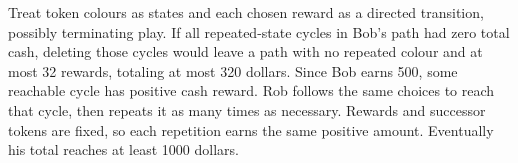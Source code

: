 Treat token colours as states and each chosen reward as a directed transition, possibly terminating play. If all repeated-state cycles in Bob's path had zero total cash, deleting those cycles would leave a path with no repeated colour and at most 32 rewards, totaling at most 320 dollars. Since Bob earns 500, some reachable cycle has positive cash reward. Rob follows the same choices to reach that cycle, then repeats it as many times as necessary. Rewards and successor tokens are fixed, so each repetition earns the same positive amount. Eventually his total reaches at least 1000 dollars.
